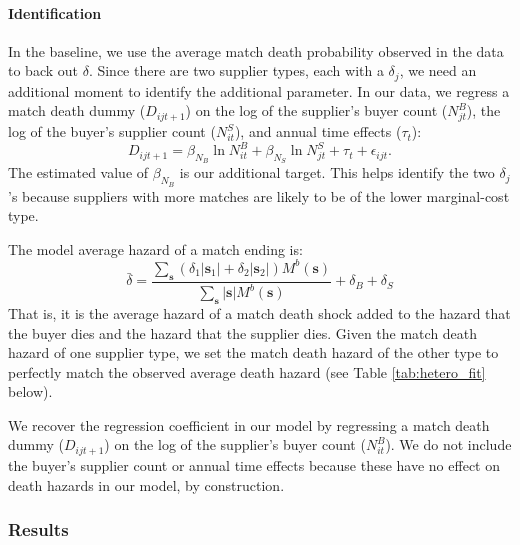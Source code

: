 \documentclass[12pt]{article} \usepackage{amsmath,amssymb,amsthm,geometry,graphicx,setspace,algorithm,algpseudocode,float}
\newcommand{\subsubsubsection}[1]{\paragraph{#1}}
\begin{document}
\subsubsubsection{Identification}

In the baseline, we use the average match death probability observed in the data to back out $\delta$. Since there are two supplier types, each with a $\delta_j$, we need an additional moment to identify the additional parameter.  In our data,
we regress a match death dummy ($D_{ijt+1}$) on the log of the supplier's buyer count ($N^B_{jt}$), the log of the buyer's supplier count ($N^S_{it}$), and annual time effects ($\tau_t$):
\begin{equation}D_{ijt+1} = \beta_{N_B} \ln N^B_{it}+ \beta_{N_S}\ln N^S_{jt}+\tau_t+\epsilon_{ijt}.
\label{DeathReg}
\end{equation}
The estimated value of $\beta_{N_B}$ is our additional target.  This helps identify the two $\delta_j$'s because suppliers with more matches are likely to be of the lower marginal-cost type.

The model average hazard of a match ending is:
\begin{equation}
    \bar{\delta} = \frac{\sum_{\mathbf{s}} \left(\delta_1 |\mathbf{s}_1|  + \delta_2 |\mathbf{s}_2|\right) M^b(\mathbf{s})}{\sum_{\mathbf{s}} |\mathbf{s}| M^b(\mathbf{s})} + \delta_B + \delta_S
\end{equation}
That is, it is the average hazard of a match death shock added to the hazard that the buyer dies and the hazard that the supplier dies.  Given the match death hazard of one supplier type, we set the match death hazard of the other type to perfectly match the observed average death hazard (see Table \ref{tab:hetero_fit} below).

We recover the regression coefficient in our model by regressing a match death dummy ($D_{ijt+1}$) on the log of the supplier's buyer count ($N^B_{it}$). We do not include the buyer's supplier count or annual time effects because these have no effect on death hazards in our model, by construction.


\subsubsection{Results}
\end{document}
